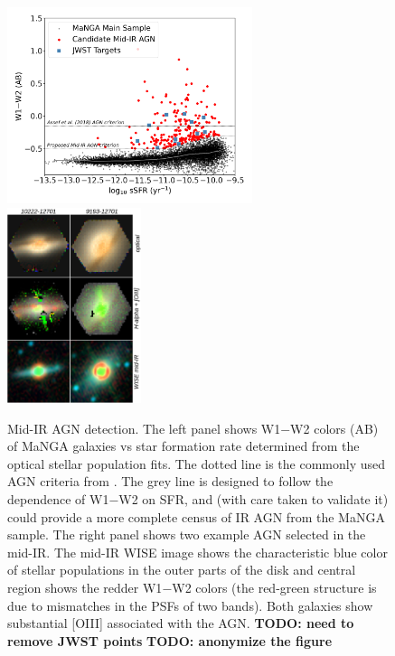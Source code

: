 \documentclass[12pt, preprint]{hacked-aastex}
\begin{document}
\begin{figure}[t!]
\includegraphics[width=0.64\textwidth]{w1w2-vs-ssfr.png}
\includegraphics[width=0.35\textwidth]{ir-grid.drawio.png}
  \vspace{-22pt}
    \caption{
\label{fig:wise} \small Mid-IR AGN detection. 
The left panel shows W1$-$W2 colors (AB) of MaNGA galaxies vs 
star formation rate determined from the optical stellar population fits. 
The dotted line is the commonly used AGN criteria from \cite{assef18a}.
The grey line is designed to follow the dependence of W1$-$W2
on SFR, and (with care taken to validate it) could provide a 
more complete census of IR AGN from the MaNGA sample. The right
panel shows two example AGN selected in the mid-IR. 
The mid-IR WISE image shows the characteristic blue color
of stellar populations
in the outer parts of the disk and central region shows 
the redder W1$-$W2 colors (the red-green structure is due to
mismatches in the PSFs of two bands). 
Both galaxies show substantial [OIII] associated with the AGN.
{\bf TODO: need to remove JWST points} {\bf TODO: anonymize the figure}}
\end{figure}
\end{document}
